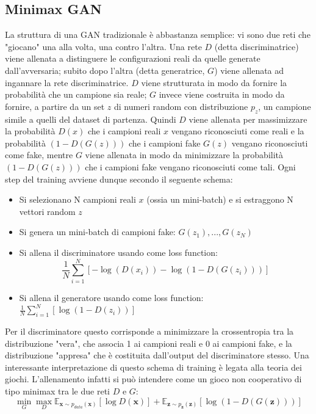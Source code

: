 \documentclass[a4paper]{article}
\begin{document}
\subsection{Minimax GAN}
La struttura di una GAN tradizionale è abbastanza semplice: vi sono due reti che "giocano" una alla volta, una contro l'altra. Una rete $D$ (detta discriminatrice) viene allenata a distinguere le configurazioni reali da quelle generate dall'avversaria; subito dopo l'altra (detta generatrice, $G$) viene allenata ad ingannare la rete discriminatrice. $D$ viene strutturata in modo da fornire la probabilità che un campione sia reale; $G$ invece viene costruita in modo da fornire, a partire da un set $z$ di numeri random con distribuzione $p_z$, un campione simile a quelli del dataset di partenza. Quindi $D$ viene allenata per massimizzare la probabilità $D(x)$ che i campioni reali $x$ vengano riconosciuti come reali e la probabilità $(1-D(G(z)))$ che i campioni fake $G(z)$ vengano riconosciuti come fake, mentre $G$ viene allenata in modo da minimizzare la probabilità $(1-D(G(z)))$ che i campioni fake vengano riconosciuti come tali.
Ogni step del training avviene dunque secondo il seguente schema:
\begin{itemize}
\item Si selezionano N campioni reali $x$ (ossia un mini-batch) e si estraggono N vettori random $z$
\item Si genera un mini-batch di campioni fake: $G(z_1), ..., G(z_N)$
\item Si allena il discriminatore usando come loss function: 
\begin{equation}
\frac{1}{N}\sum_{i=1}^{N} [-\log(D(x_i)) - \log(1-D(G(z_i)))]
\end{equation}
\item Si allena il generatore usando come loss function: $\frac{1}{N}\sum_{i=1}^{N} [\log(1-D(z_i))]$
\end{itemize}
Per il discriminatore questo corrisponde a minimizzare la crossentropia tra la distribuzione "vera", che associa 1 ai campioni reali e 0 ai campioni fake, e la distribuzione "appresa" che è costituita dall'output del discriminatore stesso. Una interessante interpretazione di questo schema di training è legata alla teoria dei giochi. L'allenamento infatti si può intendere come un gioco non cooperativo di tipo minimax tra le due reti $D$ e $G$:
\begin{equation}
\min _{G}\max _{D}\mathbb {E} _{{\boldsymbol {x}}\sim p_{data}({\boldsymbol {x}})}[\log D({\boldsymbol {x}})]+\mathbb {E} _{{\boldsymbol {z}}\sim p_{\boldsymbol {z}}({\boldsymbol {z}})}[\log(1-D(G({\boldsymbol {z}})))]
\end{equation}
\end{document}
